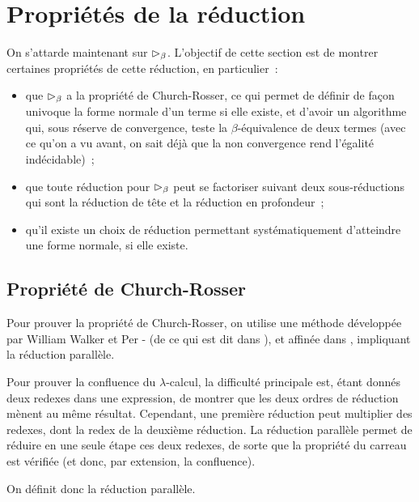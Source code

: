 \section{Propriétés de la réduction}

On s'attarde maintenant sur $\mathrel{\rhd_{\beta}}$. L'objectif de cette section est de montrer
certaines propriétés de cette réduction, en particulier~:
\begin{itemize}
\item que $\mathrel{\rhd_{\beta}}$ a la propriété de Church-Rosser, ce qui permet de définir de
  façon univoque la forme normale d'un terme si elle existe, et d'avoir un
  algorithme qui, sous réserve de convergence, teste la $\beta$-équivalence de
  deux termes (avec ce qu'on a vu avant, on sait déjà que la non convergence
  rend l'égalité indécidable)~;
\item que toute réduction pour $\mathrel{\rhd_{\beta}}$ peut se factoriser suivant deux
  sous-réductions qui sont la réduction de tête et la réduction en profondeur~;
\item qu'il existe un choix de réduction permettant systématiquement d'atteindre
  une forme normale, si elle existe.
\end{itemize}

\subsection{Propriété de Church-Rosser}

Pour prouver la propriété de Church-Rosser, on utilise une méthode développée
par William Walker  et Per - (de ce qui est
dit dans \cite{Barendregt1984}), et affinée dans \cite{Takahashi1995},
impliquant la réduction parallèle.

Pour prouver la confluence du $\lambda$-calcul, la difficulté principale est,
étant donnés deux redexes dans une expression, de montrer que les deux ordres
de réduction mènent au même résultat. Cependant, une première réduction peut
multiplier des redexes, dont la redex de la deuxième réduction. La réduction
parallèle permet de réduire en une seule étape ces deux redexes, de sorte
que la propriété du carreau est vérifiée (et donc, par extension, la
confluence).

On définit donc la réduction parallèle.

